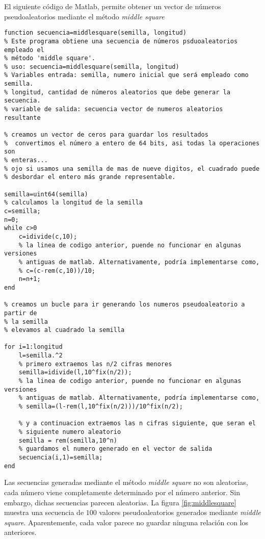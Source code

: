 El siguiente código de Matlab, permite obtener un vector de números pseudoaleatorios mediante el método \emph{middle square}

\begin{lstlisting}
function secuencia=middlesquare(semilla, longitud)
% Este programa obtiene una secuencia de números psduoaleatorios empleado el
% método 'middle square'.
% uso: secuencia=middlesquare(semilla, longitud)
% Variables entrada: semilla, numero inicial que será empleado como semilla.
% longitud, cantidad de números aleatorios que debe generar la secuencia.
% variable de salida: secuencia vector de numeros aleatorios resultante

% creamos un vector de ceros para guardar los resultados
%  convertimos el número a entero de 64 bits, asi todas la operaciones son
% enteras...
% ojo si usamos una semilla de mas de nueve digitos, el cuadrado puede
% desbordar el entero más grande representable.

semilla=uint64(semilla)
% calculamos la longitud de la semilla
c=semilla;
n=0;
while c>0
    c=idivide(c,10);
    % la linea de codigo anterior, puende no funcionar en algunas versiones
    % antiguas de matlab. Alternativamente, podría implementarse como,
    % c=(c-rem(c,10))/10;
    n=n+1;
end

% creamos un bucle para ir generando los numeros pseudoaleatorio a partir de
% la semilla
% elevamos al cuadrado la semilla
    
for i=1:longitud     
    l=semilla.^2
    % primero extraemos las n/2 cifras menores
    semilla=idivide(l,10^fix(n/2));
    % la linea de codigo anterior, puende no funcionar en algunas versiones
    % antiguas de matlab. Alternativamente, podría implementarse como,
    % semilla=(l-rem(l,10^fix(n/2)))/10^fix(n/2);
   
    % y a continuacion extraemos las n cifras siguiente, que seran el
    % siguiente numero aleatorio
    semilla = rem(semilla,10^n)
    % guardamos el numero generado en el vector de salida
    secuencia(i,1)=semilla;
end
\end{lstlisting} 

Las secuencias generadas mediante el método \emph{middle square} no son aleatorias, cada número viene completamente determinado por el número anterior. Sin embargo, dichas secuencias parecen aleatorias. La figura \ref{fig:middlesquare} muestra una secuencia de $100$ valores pseudoaleatorios generados mediante \emph{middle square}. Aparentemente, cada valor parece no guardar ninguna relación con los anteriores.

